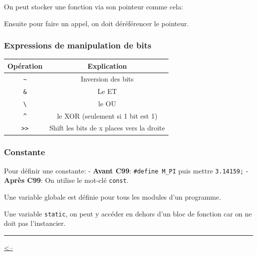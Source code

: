 On peut stocker une fonction via son pointeur comme cela:

\begin{Shaded}
\begin{Highlighting}[]
\OperatorTok{(*}\OperatorTok{)([}\OperatorTok{]+);}
 \OperatorTok{(*}\OperatorTok{)(}\OperatorTok{,} \OperatorTok{,} \OperatorTok{*);}
 \OperatorTok{(*}\OperatorTok{)(}\OperatorTok{);}
\OperatorTok{=} \OperatorTok{\&}\OperatorTok{;}
\end{Highlighting}
\end{Shaded}

Ensuite pour faire un appel, on doit déréférencer le pointeur.

\subsubsection{Expressions de manipulation de
bits}\label{expressions-de-manipulation-de-bits}

\begin{longtable}[]{@{}cc@{}}
\toprule\noalign{}
Opération & Explication \\
\midrule\noalign{}
\endhead
\bottomrule\noalign{}
\endlastfoot
\texttt{\textasciitilde{}} & Inversion des bits \\
\texttt{\&} & Le ET \\
\texttt{\textbackslash{}\textbar{}} & le OU \\
\texttt{\^{}} & le XOR (seulement si 1 bit est 1) \\
\texttt{\textgreater{}\textgreater{}} & Shift les bits de x places vers
la droite \\
\end{longtable}

\subsubsection{Constante}\label{constante}

Pour définir une constante: - \textbf{Avant C99}:
\texttt{\#define\ M\_PI} puis mettre \texttt{3.14159;} - \textbf{Après
C99}: On utilise le mot-clé \texttt{const}.

Une variable globale est définie pour tous les modules d'un programme.

Une variable \texttt{static}, on peut y accéder en dehors d'un bloc de
fonction car on ne doit pas l'instancier.

\begin{center}\rule{0.5\linewidth}{0.5pt}\end{center}

\href{../README.md}{\textless--}
